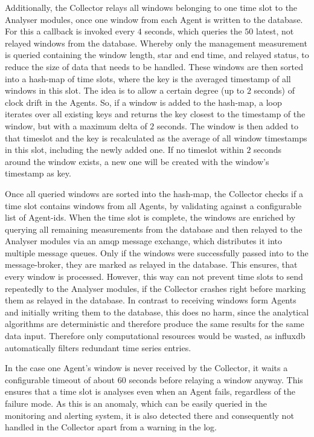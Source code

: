 Additionally, the Collector relays all windows belonging to one time slot to the Analyser modules, once one window from each Agent is written to the database.
For this a callback is invoked every $4$ seconds, which queries the $50$ latest, not relayed windows from the database. Whereby only the management measurement is queried containing the window length, star and end time, and relayed status, to reduce the size of data that needs to be handled.
These windows are then sorted into a hash-map of time slots, where the key is the averaged timestamp of all windows in this slot. The idea is to allow a certain degree (up to $2$ seconds) of clock drift in the Agents. 
So, if a window is added to the hash-map, a loop iterates over all existing keys and returns the key closest to the timestamp of the window, but with a maximum delta of $2$ seconds.
The window is then added to that timeslot and the key is recalculated as the average of all window timestamps in this slot, including the newly added one.
If no timeslot within $2$ seconds around the window exists, a new one will be created with the window's timestamp as key.

Once all queried windows are sorted into the hash-map, the Collector checks if a time slot contains windows from all Agents, by validating against a configurable list of Agent-ids.
When the time slot is complete, the windows are enriched by querying all remaining measurements from the database and then relayed to the Analyser modules via an \gls{amqp} message exchange, which distributes it into multiple message queues.
Only if the windows were successfully passed into to the message-broker, they are marked as relayed in the database. This ensures, that every window is processed. However, this way can not prevent time slots to send repeatedly to the Analyser modules, if the Collector crashes right before marking them as relayed in the database. In contrast to receiving windows form Agents and initially writing them to the database, this does no harm, since the analytical algorithms are deterministic and therefore produce the same results for the same data input. Therefore only computational resources would be wasted, as \gls{influxdb} automatically filters redundant time series entries.

In the case one Agent's window is never received by the Collector, it waits a configurable timeout of about 60 seconds before relaying a window anyway. This ensures that a time slot is analyses even when an Agent fails, regardless of the failure mode. As this is an anomaly, which can be easily queried in the monitoring and alerting system, it is also detected there and consequently not handled in the Collector apart from a warning in the log.

